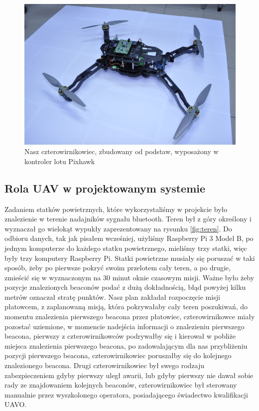 \begin{figure}[!th]
    \centering
    \includegraphics[width=15cm]{zalaczniki/obrazy/dron_czarny.jpg}
    \caption{Nasz czterowirnikowiec, zbudowany od podstaw, wyposażony w kontroler lotu Pixhawk}
    \label{fig:dronczarny}
\end{figure}


\subsection{Rola UAV w projektowanym systemie}

Zadaniem statków powietrznych, które wykorzystaliśmy w projekcie było znalezienie w terenie nadajników sygnału bluetooth. Teren był z góry określony i wyznaczał go wielokąt wypukły zaprezentowany na rysunku \ref{fig:teren}. Do odbioru danych, tak jak pisałem wcześniej, użyliśmy Raspberry Pi 3 Model B, po jednym komputerze do każdego statku powietrznego, mieliśmy trzy statki, więc były trzy komputery Raspberry Pi. Statki powietrzne musiały się poruszać w taki sposób, żeby po pierwsze pokryć swoim przelotem cały teren, a po drugie, zmieścić się w wyznaczonym na 30 minut oknie czasowym misji. Ważne było żeby pozycje znalezionych beaconów podać z dużą dokładnością, błąd powyżej kilku metrów oznaczał stratę punktów. Nasz plan zakładał rozpoczęcie misji płatowcem, z zaplanowaną misją, która pokrywałaby cały teren poszukiwań, do momentu znalezienia pierwszego beacona przez płatowiec, czterowirnikowce miały pozostać uziemione, w momencie nadejścia informacji o znalezieniu pierwszego beacona, pierwszy z czterowirnikowców podrywałby się i kierował w pobliże miejsca znalezienia pierwszego beacona, po zadowalającym dla nas przybliżeniu pozycji pierwszego beacona, czterowirnikowiec poruszałby się do kolejnego znalezionego beacona. Drugi czterowirnikowiec był swego rodzaju zabezpieczeniem gdyby pierwszy uległ awarii, lub gdyby pierwszy nie dawał sobie rady ze znajdowaniem kolejnych beaconów, czterowirnikowiec był sterowany manualnie przez wyszkolonego operatora, posiadającego świadectwo kwalifikacji UAVO. 

